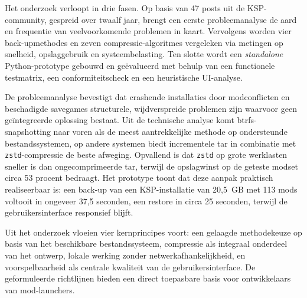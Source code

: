 Het onderzoek verloopt in drie fasen. Op basis van 47 posts uit de KSP-community, gespreid over twaalf jaar, brengt een eerste probleemanalyse de aard en frequentie van veelvoorkomende problemen in kaart. Vervolgens worden vier back-upmethodes en zeven compressie-algoritmes vergeleken via metingen op snelheid, opslaggebruik en systeembelasting. Ten slotte wordt een \textit{standalone} Python-prototype gebouwd en geëvalueerd met behulp van een functionele testmatrix, een conformiteitscheck en een heuristische UI-analyse.

De probleemanalyse bevestigt dat crashende installaties door modconflicten en beschadigde savegames structurele, wijdverspreide problemen zijn waarvoor geen geïntegreerde oplossing bestaat. Uit de technische analyse komt btrfs-snapshotting naar voren als de meest aantrekkelijke methode op ondersteunde bestandssystemen, op andere systemen biedt incrementele tar in combinatie met \texttt{zstd}-compressie de beste afweging. Opvallend is dat \texttt{zstd} op grote werklasten sneller is dan ongecomprimeerde tar, terwijl de opslagwinst op de geteste modset circa 53 procent bedraagt. Het prototype toont dat deze aanpak praktisch realiseerbaar is: een back-up van een KSP-installatie van 20{,}5~GB met 113 mods voltooit in ongeveer 37{,}5 seconden, een restore in circa 25 seconden, terwijl de gebruikersinterface responsief blijft.

Uit het onderzoek vloeien vier kernprincipes voort: een gelaagde methodekeuze op basis van het beschikbare bestandssysteem, compressie als integraal onderdeel van het ontwerp, lokale werking zonder netwerkafhankelijkheid, en voorspelbaarheid als centrale kwaliteit van de gebruikersinterface. De geformuleerde richtlijnen bieden een direct toepasbare basis voor ontwikkelaars van mod-launchers.
